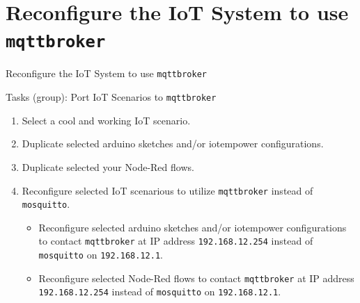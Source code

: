 \nopartpage
\part{Reconfigure the IoT System to use \texttt{mqttbroker}}
\withpartpage

\begin{frame}{Reconfigure the IoT System to use \texttt{mqttbroker}}
\begin{exampleblock}{Tasks (group): Port IoT Scenarios to \texttt{mqttbroker}}
  \begin{enumerate}
    \item \alert{Select} a cool and working \alert{IoT scenario}.
    \item \alert{Duplicate} selected \alert{arduino sketches} and/or \alert{iotempower configurations}.
    \item \alert{Duplicate} selected your \alert{Node-Red flows}.
    \item \alert{Reconfigure} selected IoT scenarious to utilize \alert{\texttt{mqttbroker}} instead of \texttt{mosquitto}.
    \begin{itemize}
    \item Reconfigure selected \alert{arduino sketches} and/or \alert{iotempower} configurations to contact \alert{\texttt{mqttbroker}} at IP address \alert{\texttt{192.168.12.254}} instead of \texttt{mosquitto} on \texttt{192.168.12.1}.
    \item Reconfigure selected \alert{Node-Red flows} to contact \alert{\texttt{mqttbroker}} at IP address \alert{\texttt{192.168.12.254}} instead of \texttt{mosquitto} on \texttt{192.168.12.1}.
    \end{itemize}
  \end{enumerate}
  \end{exampleblock}
\end{frame}
